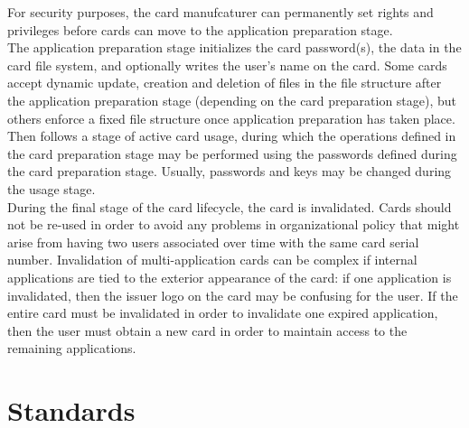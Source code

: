 For security purposes, the card manufcaturer can permanently set rights
and privileges before cards can move to the application preparation
stage.\\

The application preparation stage initializes the card password(s), the
data in the card file system, and optionally writes the user's name on
the card. Some cards accept dynamic update, creation and deletion of
files in the file structure after the application preparation stage
(depending on the card preparation stage), but others enforce a fixed
file structure once application preparation has taken place.\\

Then follows a stage of active card usage, during which the operations
defined in the card preparation stage may be performed using the
passwords defined during the card preparation stage. Usually, passwords
and keys may be changed during the usage stage.\\

During the final stage of the card lifecycle, the card is invalidated.
Cards should not be re-used in order to avoid any problems in
organizational policy that might arise from having two users associated
over time with the same card serial number. Invalidation of
multi-application cards can be complex if internal applications are
tied to the exterior appearance of the card: if one application is
invalidated, then the issuer logo on the card may be confusing for the
user. If the entire card must be invalidated in order to invalidate one
expired application, then the user must obtain a new card in order to
maintain access to the remaining applications.


\section{Standards}

